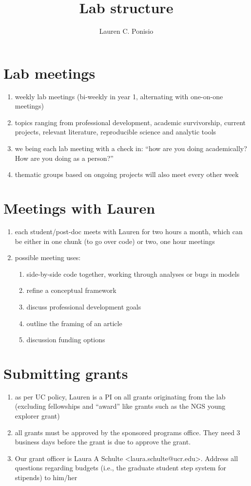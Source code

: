 \documentclass[12pt]{article}
\title{Lab structure}
\author{Lauren C. Ponisio}
\begin{document}
\maketitle

\section{Lab meetings}
\begin{enumerate}
\item weekly lab meetings (bi-weekly in year 1, alternating with
  one-on-one meetings)
\item topics ranging from professional development, academic
  survivorship, current projects, relevant literature, reproducible
  science and analytic tools
\item we being each lab meeting with a check in: ``how are you doing
  academically? How are you doing as a person?''
\item thematic groups based on ongoing projects will also meet every
  other week
\end{enumerate}

\section{Meetings with Lauren}
\begin{enumerate}
\item each student/post-doc meets with Lauren for two hours a month,
  which can be either in one chunk (to go over code) or two, one hour
  meetings
\item possible meeting uses:
  \begin{enumerate}
  \item side-by-side code together, working through analyses or bugs
    in models
  \item refine a conceptual framework
  \item discuss professional development goals
  \item outline the framing of an article
  \item discussion funding options
  \end{enumerate}
\end{enumerate}

\section{Submitting grants}
\begin{enumerate}
\item as per UC policy, Lauren is a PI on all grants originating from
  the lab (excluding fellowships and ``award'' like grants such as the
  NGS young explorer grant)
\item all grants must be approved by the sponsored programs
  office. They need 3 business days before the grant is due to
  approve the grant.
\item Our grant officer is Laura A Schulte
  <laura.schulte@ucr.edu>. Address all questions regarding budgets
  (i.e., the graduate student step system for stipends) to him/her
\end{enumerate}
\end{document}
